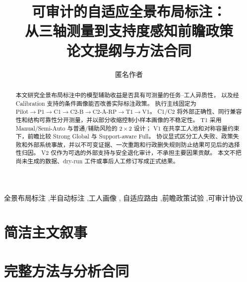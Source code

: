 \documentclass[preprint,12pt]{elsarticle}
\begin{document}
\begin{frontmatter}
\title{可审计的自适应全景布局标注：\\
从三轴测量到支持度感知前瞻政策\\
\large 论文提纲与方法合同}
\author{匿名作者}

\begin{abstract}
本文研究全景布局标注中的模型辅助收益是否具有可测量的任务--工人异质性，
以及经 Calibration 支持的条件画像能否改善实际标注政策。
执行主线固定为
\(\mathrm{Pilot}\rightarrow\mathrm{P1}\rightarrow\mathrm{C1}\rightarrow\mathrm{C2\text{-}B}
\rightarrow\mathrm{C2\text{-}A\text{-}RP}\rightarrow\mathrm{T1}\rightarrow\mathrm{V1}\)。
C1/C2 将外部正确性、同行兼容性和结构可靠性分开测量，并以部分收缩控制小样本画像的不稳定性。
T1 采用 Manual/Semi-Auto 与普通/辅助风险的 $2\times2$ 设计；
V1 在共享工人池和对称容量约束下，前瞻比较 Strong Global 与 Support-aware Full。
协议显式区分工人失败、政策失败和外部系统事故，并以不可变证据、一次重跑和行政删失规则防止结果可见后的选择性归因。
V2 仅作为可选的外部支持与安全退化审计，不承担主要因果贡献。
本文不把尚未生成的数据、dry-run 工件或事后人工修订写成正式结果。
\end{abstract}

\begin{keyword}
全景布局标注 \sep 半自动标注 \sep 工人画像 \sep
自适应路由 \sep 前瞻政策试验 \sep 可审计协议
\end{keyword}
\end{frontmatter}

\tableofcontents
\clearpage

\part{简洁主文叙事}


\clearpage
\part{完整方法与分析合同}


















\end{document}
